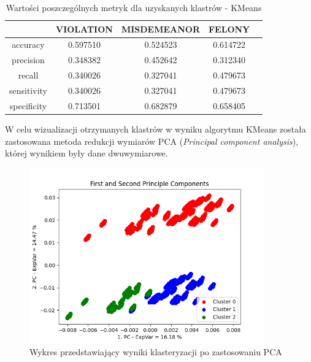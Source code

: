 \documentclass{classrep}
\begin{document}
{{{                \begin{table}[!htbp]
                \centering
                \begin{tabular}{|c|c|c|c|c|}
                    \hline
                 & VIOLATION  &  MISDEMEANOR & FELONY\\ \hline
                accuracy            &  0.597510  &   0.524523 &  0.614722  \\
                precision      &        0.348382  &   0.452642 & 0.312340 \\
                recall        &        0.340026   &  0.327041 & 0.479673   \\
                sensitivity     &       0.340026  &   0.327041 & 0.479673   \\
                specificity     &      0.713501   &  0.682879 & 0.658405  \\
                    \hline
                \end{tabular}
                \caption{Wartości poszczególnych metryk dla uzyskanych klastrów - KMeans}
                \label{tab:kmeans_metrics}
                \end{table}
                
                W celu wizualizacji otrzymanych klastrów w wyniku algorytmu KMeans została zastosowana metoda redukcji wymiarów PCA (\textit{Principal component analysis}), której wynikiem były dane dwuwymiarowe. 
                
                
                \begin{figure}[!htbp]
                    \centering
                    \includegraphics[width=0.9\textwidth]{img/clustering/pca_plot.png}
                    \caption{Wykres przedstawiający wyniki klasteryzacji po zastosowaniu PCA}
                    \label{clust_pca}
                \end{figure}
                \FloatBarrier
                
}}}
\end{document}
